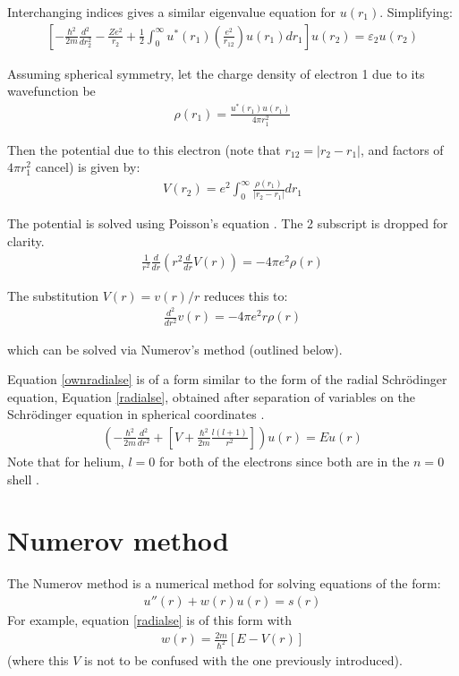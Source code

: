 \documentclass[11pt,letterpaper]{article}
\begin{document}
Interchanging indices gives a similar eigenvalue equation for $u(r_1)$.
Simplifying:
\begin{align}
\left[
-\frac{\hbar^2}{2m}\frac{d^2}{dr_2^2}
- \frac{Ze^2}{r_2}
 + \frac{1}{2}\int_0^\infty u^*(r_1) \left(\frac{e^2}{r_{12}}\right)u(r_1)dr_1
\right]
u(r_2)
=
\varepsilon_2 u(r_2)
\label{ownradialse}
\end{align}

Assuming spherical symmetry, 
let the charge density of electron 1 due to its wavefunction be
\begin{align}
\rho(r_1)= \frac{u^*(r_1)u(r_1)}{4\pi r_1^2}
\end{align}

Then the potential due to this electron (note that $r_{12} = |r_2 - r_1|$,
and factors of $4\pi r_1^2$ cancel)
is given by:
\begin{align}
V(r_2) = e^2\int_0^\infty \frac{\rho(r_1)}{|r_2-r_1|}dr_1
\end{align}

The potential is solved using Poisson's equation \cite[p.~49]{koonin90}.
The 2 subscript is dropped for clarity.
\begin{align}
\frac{1}{r^2}\frac{d}{dr}\left(r^2\frac{d}{dr}V(r)\right)
= -4\pi e^2\rho(r)
\end{align}

The substitution $V(r) = v(r)/r$ reduces this to:
\begin{align}
\frac{d^2}{dr^2}v(r)
= -4\pi e^2r\rho(r)
\end{align}

which can be solved via Numerov's method (outlined below).

Equation \eqref{ownradialse} 
is of a form similar to the form of the radial Schr\"{o}dinger
equation, Equation \eqref{radialse}, 
obtained after separation of variables on the
Schr\"{o}dinger equation in spherical coordinates
\cite[p.~140]{griffiths05}.
\begin{align}
 \left(
  -\frac{\hbar^2}{2m}\frac{d^2}{dr^2} 
  +\left[V + \frac{\hbar^2}{2m}\frac{l(l+1)}{r^2} \right]
 \right)u(r) = Eu(r)
\label{radialse}
\end{align}
Note that for helium, $l=0$ for both of the electrons since both are in the
$n=0$ shell \cite[p.~161,164]{griffiths05}.


\section{Numerov method}
The Numerov method is a numerical method for solving 
equations of the form:
\begin{align}
u''(r) + w(r)u(r) = s(r)
\label{ldeq2}
\end{align}
For example, equation \eqref{radialse} is of this
form with
\begin{align}
w(r) = \frac{2m}{\hbar^2}\left[E - V(r) \right]
\end{align}
(where this $V$ is not to be confused with the one previously introduced).
\end{document}
